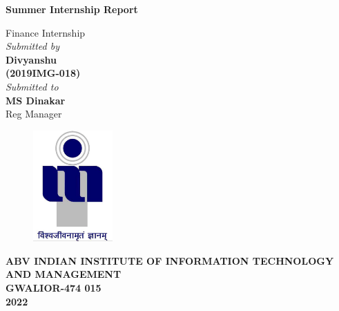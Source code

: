 \title{}
\author{}
\thispagestyle{empty}

\begin{titlepage}
\begin{center}
{\LARGE \bf Summer Internship Report} \\
\end{center}
\begin{center}
\vspace{0.6in}
{\LARGE Finance Internship} \\
\vspace{0.6in}
{\large \it Submitted by\\\vspace{0.1in}}
{\large \bf \vspace{0.2in}Divyanshu\\(2019IMG-018)\\}
\vspace{0.6in}
{\large \it Submitted to\\}
\vspace{0.1in}
{\large \bf MS Dinakar}\\
{\large Reg Manager}\\
\end {center}
\vspace{0.5in}
\begin{figure}[h]
\centerline{\includegraphics[width=1.2in]{./iiitm}}
\end{figure}
\begin{center}
{\Large \bf ABV INDIAN INSTITUTE OF INFORMATION TECHNOLOGY AND MANAGEMENT\\
GWALIOR-474 015\\}
\vspace{0.2in}
{\Large \bf 2022\\}
\end{center}
\end{titlepage}
